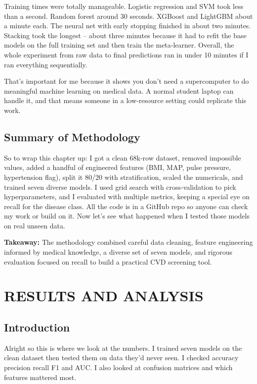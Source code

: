 \documentclass[11pt, a4paper, oneside]{book}
\begin{document}
Training times were totally manageable. Logistic regression and SVM took less than a second. Random forest around 30 seconds. XGBoost and LightGBM about a minute each. The neural net with early stopping finished in about two minutes. Stacking took the longest – about three minutes because it had to refit the base models on the full training set and then train the meta‑learner. Overall, the whole experiment from raw data to final predictions ran in under 10 minutes if I ran everything sequentially.

That's important for me because it shows you don't need a supercomputer to do meaningful machine learning on medical data. A normal student laptop can handle it, and that means someone in a low‑resource setting could replicate this work.

\section{Summary of Methodology}
So to wrap this chapter up: I got a clean 68k‑row dataset, removed impossible values, added a handful of engineered features (BMI, MAP, pulse pressure, hypertension flag), split it 80/20 with stratification, scaled the numericals, and trained seven diverse models. I used grid search with cross‑validation to pick hyperparameters, and I evaluated with multiple metrics, keeping a special eye on recall for the disease class. All the code is in a GitHub repo so anyone can check my work or build on it. Now let’s see what happened when I tested those models on real unseen data.

\begin{takeaway}
\textbf{Takeaway:} The methodology combined careful data cleaning, feature engineering informed by medical knowledge, a diverse set of seven models, and rigorous evaluation focused on recall to build a practical CVD screening tool.
\end{takeaway}
\chapter{RESULTS AND ANALYSIS}

\section{Introduction}
Alright so this is where we look at the numbers. I trained seven models on the clean dataset then tested them on data they'd never seen. I checked accuracy precision recall F1 and AUC. I also looked at confusion matrices and which features mattered most.
\end{document}

